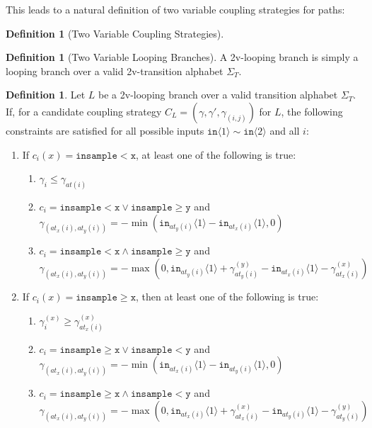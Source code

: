 \documentclass[12pt]{article}
\newcommand{\gguard}[1][x]{\texttt{insample}\geq #1}
\newcommand{\lguard}[1][x]{\texttt{insample} < #1}
\newcommand{\brangle}[1]{\langle #1 \rangle}
\theoremstyle{definition}
\newtheorem{defn}[thm]{Definition}
\begin{document}
This leads to a natural definition of two variable coupling strategies for paths:

\begin{defn}[Two Variable Coupling Strategies]
    
\end{defn}

\begin{defn}[Two Variable Looping Branches]
    A 2v-looping branch is simply a looping branch over a valid 2v-transition alphabet $\Sigma_T$.
\end{defn}

\begin{defn}
    Let $L$ be a 2v-looping branch over a valid transition alphabet $\Sigma_T$. If, for a candidate coupling strategy $C_L = (\gamma, \gamma', \gamma_{(i, j)})$ for $L$, the following constraints are satisfied for all possible inputs $\texttt{in}\brangle{1}\sim\texttt{in}\brangle{2}$ and all $i$: \begin{enumerate}
        \item If $c_i(x) = \lguard[\texttt{x}]$, at least one of the following is true:\begin{enumerate}
            \item $\gamma_i\leq\gamma_{at(i)}$
            \item $c_i = \lguard[\texttt{x}]\lor\gguard[\texttt{y}]$ and $\gamma_{(at_x(i), at_y(i))} = -\min(\texttt{in}_{at_y(i)}\brangle{1}-\texttt{in}_{at_x(i)}\brangle{1}, 0)$ 
            \item $c_i = \lguard[\texttt{x}]\land\gguard[\texttt{y}]$ and $\gamma_{(at_x(i), at_y(i))} = -\max(0, \texttt{in}_{at_y(i)}\brangle{1}+ \gamma_{at_y(i)}^{(y)}-\texttt{in}_{at_x(i)}\brangle{1}-\gamma_{at_x(i)}^{(x)})$ 
        \end{enumerate}
        \item If $c_i(x) = \gguard[\texttt{x}]$, then at least one of the following is true: \begin{enumerate}
            \item $\gamma_i^{(x)}\geq \gamma^{(x)}_{at_x(i)}$
            \item $c_i = \gguard[\texttt{x}]\lor\lguard[\texttt{y}]$ and $\gamma_{(at_x(i), at_y(i))} = -\min(\texttt{in}_{at_x(i)}\brangle{1}-\texttt{in}_{at_y(i)}\brangle{1}, 0)$ 
            \item $c_i = \gguard[\texttt{x}]\land\lguard[\texttt{y}]$ and $\gamma_{(at_x(i), at_y(i))} = -\max(0, \texttt{in}_{at_x(i)}\brangle{1}+ \gamma_{at_x(i)}^{(x)}-\texttt{in}_{at_y(i)}\brangle{1}-\gamma_{at_y(i)}^{(y)})$ 

\end{enumerate}
\end{enumerate}
\end{defn}
\end{document}

